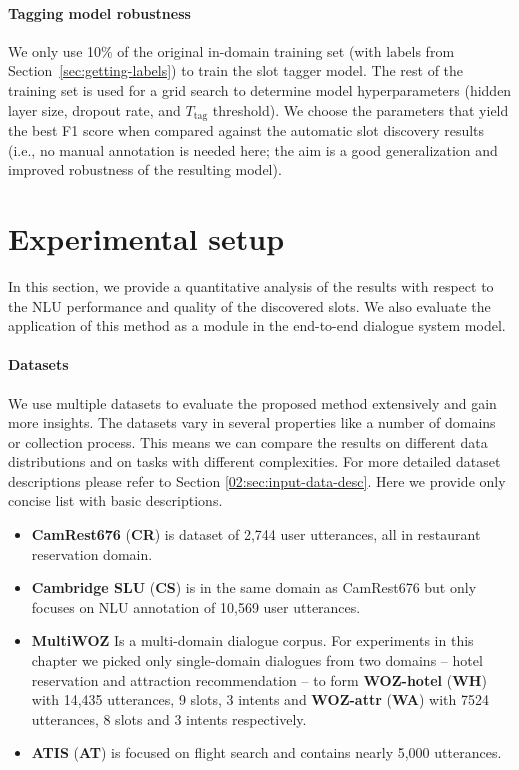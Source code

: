\paragraph{Tagging model robustness} 
We only use 10\% of the original in-domain training set (with labels from Section~\ref{sec:getting-labels}) to train the slot tagger model.
The rest of the training set is used for a grid search to determine model hyperparameters (hidden layer size, dropout rate, and $T_{\text{tag}}$ threshold). We choose the parameters that yield the best F1 score when compared against the automatic slot discovery results (i.e., no manual annotation is needed here; the aim is a good generalization and improved robustness of the resulting model).


\section{Experimental setup}
\label{04:sec:discovery_results}
In this section, we provide a quantitative analysis of the results with respect to the NLU performance and quality of the discovered slots.
We also evaluate the application of this method as a module in the end-to-end dialogue system model.
\paragraph{Datasets}
We use multiple datasets to evaluate the proposed method extensively and gain more insights.
The datasets vary in several properties like a number of domains or collection process.
This means we can compare the results on different data distributions and on tasks with different complexities.
For more detailed dataset descriptions please refer to Section \ref{02:sec:input-data-desc}.
Here we provide only concise list with basic descriptions.
\begin{itemize}
    \item \textbf{CamRest676} (\textbf{CR}) is dataset of 2,744 user utterances, all in restaurant reservation domain.
    \item \textbf{Cambridge SLU} (\textbf{CS}) is in the same domain as CamRest676 but only focuses on NLU annotation of  10,569 user utterances.
    \item \textbf{MultiWOZ} Is a multi-domain dialogue corpus. For experiments in this chapter we picked only single-domain dialogues from two domains -- hotel reservation and attraction recommendation -- to form \textbf{WOZ-hotel} (\textbf{WH}) with 14,435 utterances, 9 slots, 3 intents and \textbf{WOZ-attr} (\textbf{WA}) with 7524 utterances, 8 slots and 3 intents respectively.
    \item \textbf{ATIS} (\textbf{AT}) is focused on flight search and contains nearly 5,000 utterances.
\end{itemize}
